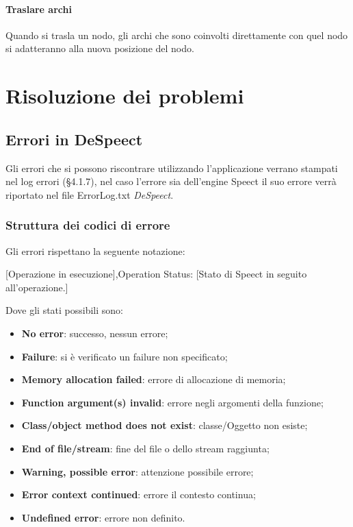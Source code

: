 \documentclass[openany,12pt,a4paper]{report}
\begin{document}
	\subsubsection{Traslare archi}
	Quando si trasla un nodo, gli archi che sono coinvolti direttamente con quel nodo si adatteranno alla nuova posizione del nodo.
	
	\chapter{Risoluzione dei problemi}
	
	\section{Errori in DeSpeect}
	Gli errori che si possono riscontrare utilizzando l’applicazione verrano stampati nel log errori (§4.1.7), nel caso l'errore sia dell'engine Speect il suo errore verrà riportato nel file ErrorLog.txt \textit{DeSpeect}.
	
	\subsection{Struttura dei codici di errore}
	Gli errori rispettano la seguente notazione:
	
	\begin{center}
		[Operazione in esecuzione],Operation Status: [Stato di Speect in seguito all'operazione.]
	\end{center}
	
	\noindent Dove gli stati possibili sono:
	\begin{itemize}
		\item \textbf{No error}: successo, nessun errore;
		\item \textbf{Failure}: si è verificato un failure non specificato;
		\item \textbf{Memory allocation failed}: errore di allocazione di memoria;
		\item \textbf{Function argument(s) invalid}: errore negli argomenti della funzione;
		\item \textbf{Class/object method does not exist}: classe/Oggetto non esiste;
		\item \textbf{End of file/stream}: fine del file o dello stream raggiunta;
		\item \textbf{Warning, possible error}: attenzione possibile errore;
		\item \textbf{Error context continued}: errore il contesto continua;
		\item \textbf{Undefined error}: errore non definito.
	\end{itemize}
\end{document}
